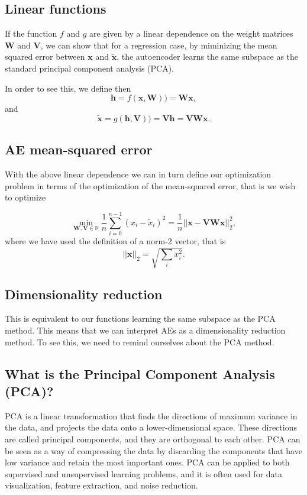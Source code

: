 \documentclass[%
oneside,                 %
final,                   %
10pt]{article}
\begin{document}
\subsection{Linear functions}

If the function $f$ and $g$ are given by a linear dependence on the
weight matrices $\bm{W}$ and $\bm{V}$, we can show that for a
regression case, by miminizing the mean squared error between $\bm{x}$
and $\tilde{\bm{x}}$, the autoencoder learns the same subspace as the
standard principal component analysis (PCA).

In order to see this, we define then
\[
\bm{h} = f(\bm{x},\bm{W}))=\bm{W}\bm{x},
\]
and
\[
\tilde{\bm{x}} = g(\bm{h},\bm{V}))=\bm{V}\bm{h}=\bm{V}\bm{W}\bm{x}.
\]

\subsection{AE mean-squared error}

With the above linear dependence we can in turn define our
optimization problem in terms of the optimization of the mean-squared
error, that is we wish to optimize

\[
\min_{\bm{W},\bm{V}\in {\mathbb{R}}}\frac{1}{n}\sum_{i=0}^{n-1}\left(x_i-\tilde{x}_i\right)^2=\frac{1}{n}\vert\vert \bm{x}-\bm{V}\bm{W}\bm{x}\vert\vert_2^2,
\]
where we have used the definition of  a norm-2 vector, that is
\[
\vert\vert \bm{x}\vert\vert_2 = \sqrt{\sum_i x_i^2}. 
\]

\subsection{Dimensionality reduction}

This is equivalent to our functions learning the same subspace as
the PCA method. This means that we can interpret AEs as a
dimensionality reduction method.  To see this, we need to remind
ourselves about the PCA method.

\subsection{What is the Principal Component Analysis (PCA)?}

PCA is a linear transformation that finds the directions of maximum
variance in the data, and projects the data onto a lower-dimensional
space. These directions are called principal components, and they are
orthogonal to each other. PCA can be seen as a way of compressing the
data by discarding the components that have low variance and retain
the most important ones. PCA can be applied to both supervised and
unsupervised learning problems, and it is often used for data
visualization, feature extraction, and noise reduction.
\end{document}
